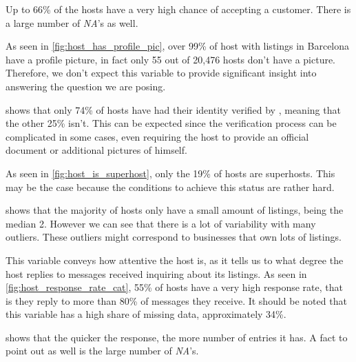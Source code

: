 
Up to 66\% of the hosts have a very high chance of accepting a customer. There
is a large number of \emph{NA}'s as well.



As seen in \cref{fig:host_has_profile_pic}, over 99\% of host with
listings in Barcelona have a profile picture, in fact only 55 out of 20,476
hosts don't have a picture. Therefore, we don't expect this variable to provide
significant insight into answering the question we are posing.


 shows that only 74\% of hosts have had
their identity verified by \airbnb, meaning that the other 25\% isn't.  This can
be expected since the verification process can be complicated in some cases,
even requiring the host to provide an official document or additional pictures
of himself.


As seen in \cref{fig:host_is_superhost}, only the 19\% of hosts are superhosts.
This may be the case because the conditions to achieve this status are rather hard.



 shows that the majority of hosts only have a
small amount of listings, being the median 2. However we can see that there is a
lot of variability with many outliers. These outliers might correspond to
businesses that own lots of listings.




This variable conveys how attentive the host is, as it tells us to what degree
the host replies to messages received inquiring about its listings. As seen in
\cref{fig:host_response_rate_cat}, 55\% of hosts have a very high
response rate, that is they reply to more than 80\% of messages they receive.
It should be noted that this variable has a high share of missing data,
approximately 34\%.



 shows that the quicker the response, the more
number of entries it has. A fact to point out as well is the large number of
\emph{NA}'s.


